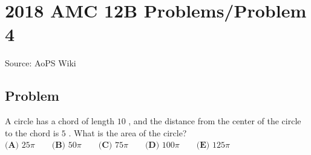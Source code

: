 \documentclass[12pt]{article}
\begin{document}
\section*{{2018 AMC 12B Problems/Problem 4}}
Source: AoPS Wiki

\subsection*{Problem}
A circle has a chord of length $10$ , and the distance from the center of the circle to the chord is $5$ . What is the area of the circle? $\textbf{(A) }25\pi \qquad \textbf{(B) }50\pi \qquad \textbf{(C) }75\pi \qquad \textbf{(D) }100\pi \qquad \textbf{(E) }125\pi \qquad$
\end{document}
